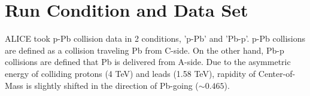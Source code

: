 


\section{Run Condition and Data Set}
\label{sec_3_runcondition}
ALICE took p-Pb collision data in 2 conditions, 'p-Pb' and 'Pb-p'.
p-Pb collisions are defined as a collision traveling Pb from C-side. 
On the other hand, Pb-p collisions are defined that Pb is delivered from A-side. 
Due to the asymmetric energy of colliding protons (4 TeV) and leads (1.58 TeV), rapidity of Center-of-Mass is slightly shifted in the direction of Pb-going ($\sim 0.465$).

